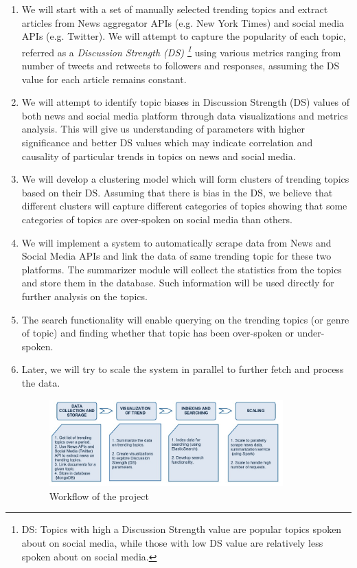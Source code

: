 \documentclass{proc}
\begin{document}
\begin{enumerate}

\item We will start with a set of manually selected trending topics and extract articles from News aggregator APIs (e.g. New York Times) and social media APIs (e.g. Twitter). We will attempt to capture the popularity of each topic, referred as a
\textit{Discussion Strength (DS)
\footnote{DS: Topics with high a Discussion Strength value are popular topics spoken about on social media, while those with low DS value are relatively less spoken about on social media.}}
using various metrics ranging from number of tweets and retweets to followers and responses, assuming the DS value for each article remains constant.

\item We will attempt to identify topic biases in Discussion Strength (DS) values of both news and social media platform through data visualizations and metrics analysis. This will give us understanding of parameters with higher significance and better DS values which may indicate correlation and causality of particular trends in topics on news and social media.

\item We will develop a clustering model which will form clusters of trending topics based on their DS. Assuming that there is
bias in the DS, we believe that different clusters will capture different categories of topics showing that some categories of topics
are over-spoken on social media than others.

\item We will implement a system to automatically scrape data from News and Social Media APIs and link the data of same trending topic
for these two platforms. The summarizer module will collect the statistics from the topics and store them in the database. Such information will be used directly for further analysis on the topics.

\item The search functionality will enable querying on the trending topics (or genre of topic) and finding whether that topic has been over-spoken or under-spoken. 

\item Later, we will try to scale the system in parallel to further fetch and process the data. 

\begin{figure}[t]
\includegraphics[width=9cm]{workflow.jpg}
\caption{Workflow of the project}
\end{figure}

\end{enumerate}
\end{document}
